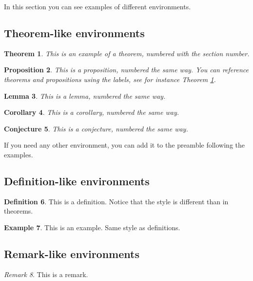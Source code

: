 \documentclass[12,twoside]{TFG-GM}
\newtheorem{theorem}{Theorem}[section]
\newtheorem{proposition}[theorem]{Proposition}
\newtheorem{lemma}[theorem]{Lemma}
\newtheorem{corollary}[theorem]{Corollary}
\newtheorem{conjecture}[theorem]{Conjecture}
\theoremstyle{definition}
\newtheorem{definition}[theorem]{Definition}
\newtheorem{example}[theorem]{Example}
\theoremstyle{remark}
\newtheorem{remark}[theorem]{Remark}
\begin{document}
In this section you can see examples of different environments.

\subsection{Theorem-like environments}

\begin{theorem} \label{th:example}
This is an example of a theorem, numbered with the section number.
\end{theorem}

\begin{proposition}
This is a proposition, numbered the same way. You can reference theorems and propositions using the labels, see for instance Theorem \ref{th:example}.
\end{proposition}

\begin{lemma}
This is a lemma, numbered the same way.
\end{lemma}

\begin{corollary}
This is a corollary, numbered the same way.
\end{corollary}

\begin{conjecture}
This is a conjecture, numbered the same way.
\end{conjecture}

If you need any other environment, you can add it to the preamble following the examples.

\subsection{Definition-like environments}

\begin{definition}
This is a definition. Notice that the style is different than in theorems.
\end{definition}

\begin{example}
This is an example. Same style as definitions.
\end{example}

\subsection{Remark-like environments}

\begin{remark}
This is a remark. 
\end{remark}
\end{document}
